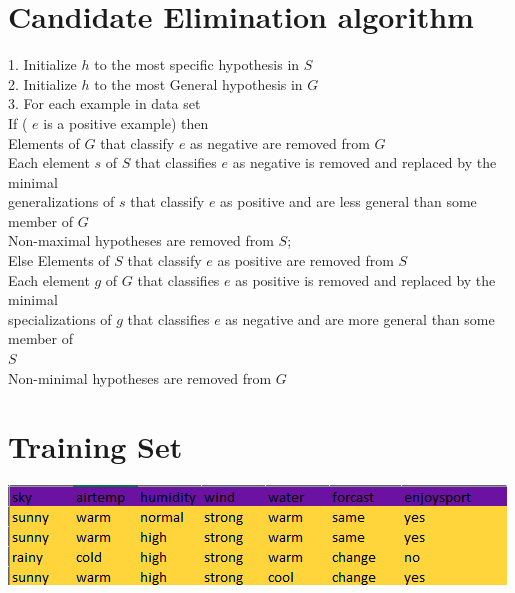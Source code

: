 \documentclass[a4paper]{article}
\begin{document}
	\section{Candidate Elimination algorithm}
	1. Initialize $h$ to the most specific hypothesis in $S$\\
    2. Initialize $h$ to the most General hypothesis in $G$\\
    3. For each example in data set\\
	\hspace{10mm}If ( $e$ is a positive example) then\\
	\hspace{20mm}Elements of $G$ that classify $e$ as negative are removed from $G$\\
	\hspace{20mm}Each element $s$ of $S$ that classifies $e$ as negative is removed and replaced by the minimal \\
	\hspace{20mm}generalizations of $s$ that classify $e$ as positive and are less general than some member of $G$\\
	\hspace{30mm}Non-maximal hypotheses are removed from $S$;\\
	\hspace{10mm}Else    Elements of $S$ that classify $e$ as positive are removed from $S$\\
	\hspace{20mm}Each element $g$ of $G$ that classifies $e$ as positive is removed and replaced by the minimal \\
	\hspace{20mm}specializations of $g$ that classifies $e$ as negative and are more general than some member of \\ \hspace{20mm}$S$\\
	\hspace{30mm}Non-minimal hypotheses are removed from $G$ \\
	
	
	\section{Training Set}
	\includegraphics[scale=1.3]{enjoysport.png}
	\newpage
\end{document}
